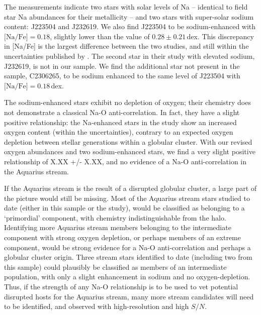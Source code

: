 \documentclass{emulateapj}
\begin{document}


The \citet{wylie-de-boer;et-al_2012} measurements indicate two stars with solar levels of Na \--- identical to field star Na abundances for their metallicity \--- and two stars with super-solar sodium content: J223504 and J232619.
We also find J223504 to be sodium-enhanced with $\mbox{[Na/Fe]} = 0.18$, slightly lower than the \citet{wylie-de-boer;et-al_2012} value of $0.28 \pm 0.21$\,dex. This discrepancy in [Na/Fe] is the largest difference between the two studies, and still within the uncertainties published by \citet{wylie-de-boer;et-al_2012}. The second star in their study with elevated sodium, J232619, is not in our sample. We find the additional star not present in the \citet{wylie-de-boer;et-al_2012} sample, C2306265, to be sodium enhanced to the same level of J223504 with $\mbox{[Na/Fe]} = 0.18$\,dex.

The sodium-enhanced stars exhibit no depletion of oxygen; their chemistry does not demonstrate a classical Na-O anti-correlation. In fact, they have a slight positive relationship: the Na-enhanced stars in the \citet{wylie-de-boer;et-al_2012} study show an increased oxygen content (within the uncertainties), contrary to an expected oxygen depletion between stellar generations within a globular cluster. With our revised oxygen abundances and two sodium-enhanced stars, we find a very slight positive relationship of X.XX +/- X.XX, and no evidence of a Na-O anti-correlation in the Aquarius stream. 


If the Aquarius stream is the result of a disrupted globular cluster, a large part of the picture would still be missing. Most of the Aquarius stream stars studied to date (either in this sample or the \citet{wylie-de-boer;et-al_2012} study), would be classified as belonging to a `primordial' component, with chemistry indistinguishable from the halo. Identifying more Aquarius stream members belonging to the intermediate component with strong oxygen depletion, or perhaps members of an extreme component, would be strong evidence for a Na-O anti-correlation and perhaps a globular cluster origin. Three stream stars identified to date (including two from this sample) could plausibly be classified as members of an intermediate population, with only a slight enhancement in sodium and no oxygen-depletion. Thus, if the strength of any Na-O relationship is to be used to vet potential disrupted hosts for the Aquarius stream, many more stream candidates will need to be identified, and observed with high-resolution and high $S/N$.
\end{document}

